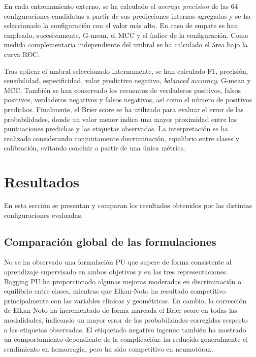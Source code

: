En cada entrenamiento externo, se ha calculado el \textit{average precision} de las 64 configuraciones candidatas a partir de sus predicciones internas agregadas y se ha seleccionado la configuración con el valor más alto. En caso de empate se han empleado, sucesivamente, G-mean, el MCC y el índice de la configuración. Como medida complementaria independiente del umbral se ha calculado el área bajo la curva ROC.

Tras aplicar el umbral seleccionado internamente, se han calculado F1, precisión, sensibilidad, especificidad, valor predictivo negativo, \textit{balanced accuracy}, G-mean y MCC. También se han conservado los recuentos de verdaderos positivos, falsos positivos, verdaderos negativos y falsos negativos, así como el número de positivos predichos. Finalmente, el Brier score se ha utilizado para evaluar el error de las probabilidades, donde un valor menor indica una mayor proximidad entre las puntuaciones predichas y las etiquetas observadas. La interpretación se ha realizado considerando conjuntamente discriminación, equilibrio entre clases y calibración, evitando concluir a partir de una única métrica.

\section{Resultados}

En esta sección se presentan y comparan los resultados obtenidos por las distintas configuraciones evaluadas.

\subsection{Comparación global de las formulaciones}

No se ha observado una formulación PU que supere de forma consistente al aprendizaje supervisado en ambos objetivos y en las tres representaciones. Bagging PU ha proporcionado algunas mejoras moderadas en discriminación o equilibrio entre clases, mientras que Elkan-Noto ha resultado competitivo principalmente con las variables clínicas y geométricas. En cambio, la corrección de Elkan-Noto ha incrementado de forma marcada el Brier score en todas las modalidades, indicando un mayor error de las probabilidades corregidas respecto a las etiquetas observadas. El etiquetado negativo ingenuo también ha mostrado un comportamiento dependiente de la complicación: ha reducido generalmente el rendimiento en hemorragia, pero ha sido competitivo en neumotórax.

